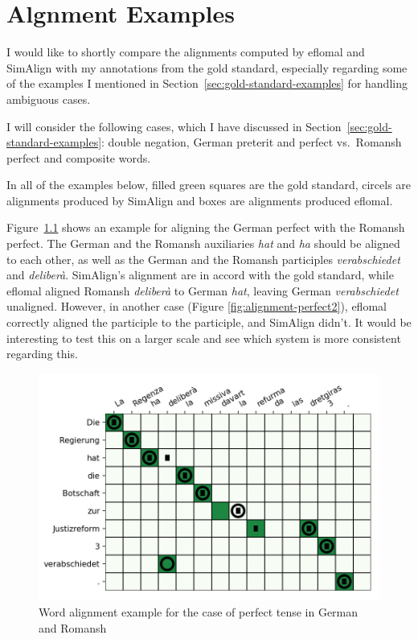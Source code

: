 \chapter{Algnment Examples}\label{appendix-a}

I would like to shortly compare the  alignments computed by eflomal and SimAlign with my annotations from the gold standard, especially regarding some of the examples I mentioned in Section~\ref{sec:gold-standard-examples} for handling ambiguous cases.

I will consider the following cases, which I have discussed in Section~\ref{sec:gold-standard-examples}: double negation, German preterit and perfect vs.~Romansh perfect and composite words.

In all of the examples below, filled green squares are the gold standard, circels are alignments produced by SimAlign and boxes are alignments produced eflomal.

Figure~\ref{fig:alignment-perfect} shows an example for aligning the German perfect with the Romansh perfect. 
The German and the Romansh auxiliaries \emph{hat} and \emph{ha} should be aligned to each other, as well as the German and the Romansh participles \emph{verabschiedet} and \emph{deliberà}. 
SimAlign's alignment are in accord with the gold standard, while eflomal aligned Romansh \emph{deliberà} to German \emph{hat}, leaving German \emph{verabschiedet} unaligned. However, in another case (Figure \ref{fig:alignment-perfect2}), eflomal correctly aligned the participle to the participle, and SimAlign didn't. 
It would be interesting to test this on a larger scale and see which system is more consistent regarding this.

\begin{figure}[ht]
\includegraphics{graphics/alignments/example1.png}
\caption{Word alignment example for the case of perfect tense in German and Romansh}\label{fig:alignment-perfect}
\end{figure}


